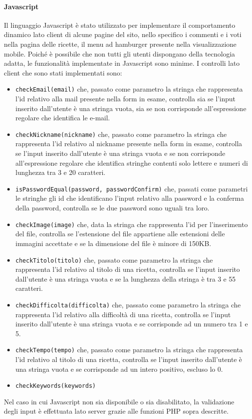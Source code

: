 \paragraph{Javascript}\label{par:javascript}
Il linguaggio Javascript è stato utilizzato per implementare il comportamento dinamico lato client di alcune pagine del sito, nello specifico i commenti e i voti nella pagina delle ricette, il menu ad hamburger presente nella visualizzazione mobile.
Poiché è possibile che non tutti gli utenti dispongano della tecnologia adatta, le funzionalità implementate in Javascript sono minime. \newline
I controlli lato client che sono stati implementati sono: 
\begin{itemize}
	\item \texttt{checkEmail(email)} che, passato come parametro la stringa che rappresenta l'id relativo alla mail presente nella form in esame, controlla sia se l'input inserito dall'utente è una stringa vuota, sia se non corrisponde all'espressione regolare che identifica le e-mail.
	\item \texttt{checkNickname(nickname)} che, passato come parametro la stringa che rappresenta l'id relativo al nickname presente nella form in esame, controlla se l'input inserito dall'utente è una stringa vuota e se non corrisponde all'espressione regolare che identifica stringhe contenti solo lettere e numeri di lunghezza tra 3 e 20 caratteri.
	\item \texttt{isPasswordEqual(password, passwordConfirm)} che, passati come parametri le stringhe gli id che identificano l'input relativo alla password e la conferma della password, controlla se le due password sono uguali tra loro.
	\item \texttt{checkImage(image)} che, data la stringa che rappresenta l'id per l'inserimento del file, controlla se l'estensione del file appartiene alle estensioni delle immagini accettate e se la dimensione del file è minore di 150KB.
	\item \texttt{checkTitolo(titolo)} che, passato come parametro la stringa che rappresenta l'id relativo al titolo di una ricetta, controlla se l'input inserito dall'utente è una stringa vuota e se la lunghezza della stringa è tra 3 e 55 caratteri.
	\item \texttt{checkDifficolta(difficolta)} che, passato come parametro la stringa che rappresenta l'id relativo alla difficoltà di una ricetta, controlla se l'input inserito dall'utente è una stringa vuota e se corrisponde ad un numero tra 1 e 5.
	\item \texttt{checkTempo(tempo)} che, passato come parametro la stringa che rappresenta l'id relativo al titolo di una ricetta, controlla se l'input inserito dall'utente è una stringa vuota e se corrisponde ad un intero positivo, escluso lo 0.
	\item \texttt{checkKeywords(keywords)}
\end{itemize}
Nel caso in cui Javascript non sia disponibile o sia disabilitato, la validazione degli input è effettuata lato server grazie alle funzioni PHP sopra descritte.

